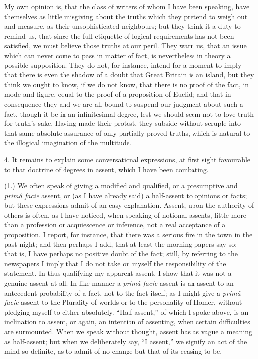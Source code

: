 My own opinion is, that the class of writers of whom I have
been speaking, have themselves as little misgiving about the truths
which they pretend to weigh out and measure, as their unsophisticated
neighbours; but they think it a duty to remind us, that since the full
etiquette of logical requirements has not been satisfied, we must
believe those truths at our peril. They warn us, that an issue which
can never come to pass in matter of fact, is nevertheless in theory a
possible supposition. They do not, for instance, intend for a moment
to imply that there is even the shadow of a doubt that Great Britain
is an island, but they think we ought to know, if we do not know, that
there is no proof of the fact, in mode and figure, equal to the proof
of a proposition of Euclid; and that in consequence they and we are
all bound to suspend our judgment about such a fact, though it be in
an infinitesimal degree, lest we should seem not to love truth for
truth's sake. Having made their protest, they subside without scruple
into that same absolute assurance of only partially-proved truths,
which is natural to the illogical imagination of the multitude.

4. It remains to explain some conversational expressions, at first
sight favourable to that doctrine of degrees in assent, which I have
been combating.

(1.) We often speak of giving a modified and qualified, or a
presumptive and \emph{primâ facie} assent, or (as I have already
said) a half-assent to opinions or facts; but these expressions admit
of an easy explanation. Assent, upon the authority of others is often,
as I have noticed, when speaking of notional assents, little more
than a profession or acquiescence or inference, not a real
acceptance of a proposition. I report, for instance, that there was a
serious fire in the town in the past night; and then perhaps I add,
that at least the morning papers say so;—that is, I have perhaps no
positive doubt of the fact; still, by referring to the newspapers I
imply that I do not take on myself the responsibility of the
statement. In thus qualifying my apparent assent, I show that it was
not a genuine assent at all. In like manner a \emph{primâ facie}
assent is an assent to an antecedent probability of a fact, not to the
fact itself; as I might give a \emph{primâ facie} assent to the
Plurality of worlds or to the personality of Homer, without pledging
myself to either absolutely. ``Half-assent,'' of which I spoke
above, is an inclination to assent, or again, an intention of
assenting, when certain difficulties are surmounted. When we speak
without thought, assent has as vague a meaning as half-assent; but
when we deliberately say, ``I assent,'' we signify an act of
the mind so definite, as to admit of no change but that of its ceasing
to be.

